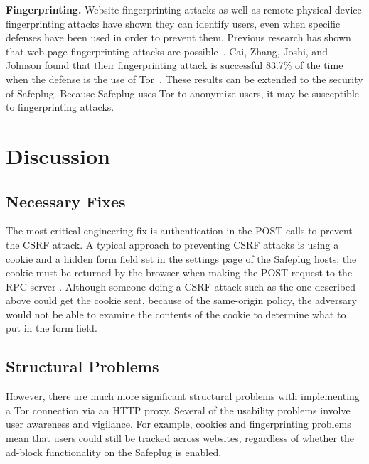 \documentclass[letterpaper,twocolumn,10pt]{article}
\begin{document}
{\bf Fingerprinting.}  Website fingerprinting attacks as well as remote physical device fingerprinting attacks have shown they can identify users, even when specific defenses have been used in order to prevent them. Previous research has shown that web page fingerprinting attacks are possible~\cite{dyer, herrmann, panchenko}.  Cai, Zhang, Joshi, and Johnson found that their fingerprinting attack is successful 83.7\% of the time when the defense is the use of Tor~\cite{fingerprint1}.  These results can be extended to the security of Safeplug.  Because Safeplug uses Tor to anonymize users, it may be susceptible to fingerprinting attacks.

\section{Discussion}
\subsection{Necessary Fixes}
The most critical engineering fix is authentication in the POST calls to prevent the CSRF attack.  A typical approach to preventing CSRF attacks is using a cookie and a hidden form field set in the settings page of the Safeplug hosts; the cookie must be returned by the browser when making the POST request to the RPC server \cite{csrfdef}.  Although someone doing a CSRF attack such as the one described above could get the cookie sent, because of the same-origin policy, the adversary would not be able to examine the contents of the cookie to determine what to put in the form field.

\subsection{Structural Problems}
However, there are much more significant structural problems with implementing a Tor connection via an HTTP proxy.  Several of the usability problems involve user awareness and vigilance.  For example, cookies and fingerprinting problems mean that users could still be tracked across websites, regardless of whether the ad-block functionality on the Safeplug is enabled.  
\end{document}
